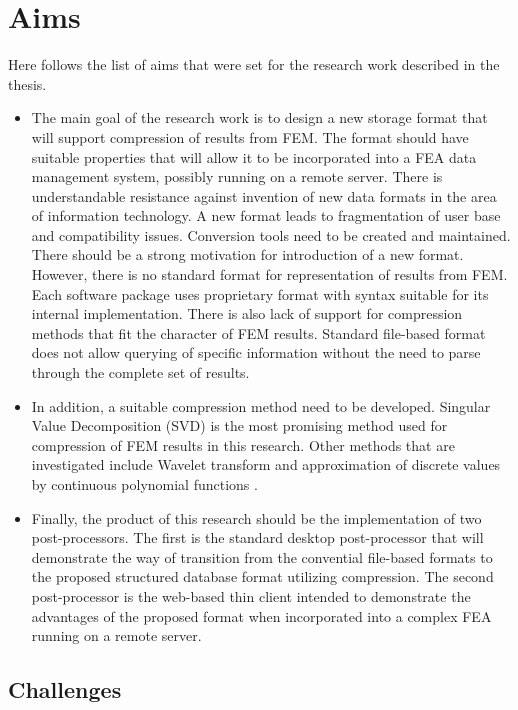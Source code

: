 \chapter{Aims}
\label{chapter:aims}

Here follows the list of aims that were set for the research work described in the thesis.

\begin{itemize}
    \item The main goal of the research work is to design a new storage format that will support compression of results from FEM. The format should have suitable properties that will allow it to be incorporated into a FEA data management system, possibly running on a remote server. There is understandable resistance against invention of new data formats in the area of information technology. A new format leads to fragmentation of user base and compatibility issues. Conversion tools need to be created and maintained. There should be a strong motivation for introduction of a new format. However, there is no standard format for representation of results from FEM. Each software package uses proprietary format with syntax suitable for its internal implementation. There is also lack of support for compression methods that fit the character of FEM results. Standard file-based format does not allow querying of specific information without the need to parse through the complete set of results.
    \item In addition, a suitable compression method need to be developed. Singular Value Decomposition (SVD) is the most promising method used for compression of FEM results in this research. Other methods that are investigated include Wavelet transform \cite{Li2014} and approximation of discrete values by continuous polynomial functions \cite{Benes2016,Benes2016Pollack}.
    \item Finally, the product of this research should be the implementation of two post-processors. The first is the standard desktop post-processor that will demonstrate the way of transition from the convential file-based formats to the proposed structured database format utilizing compression. The second post-processor is the web-based thin client intended to demonstrate the advantages of the proposed format when incorporated into a complex FEA running on a remote server.
\end{itemize}

\section{Challenges}

